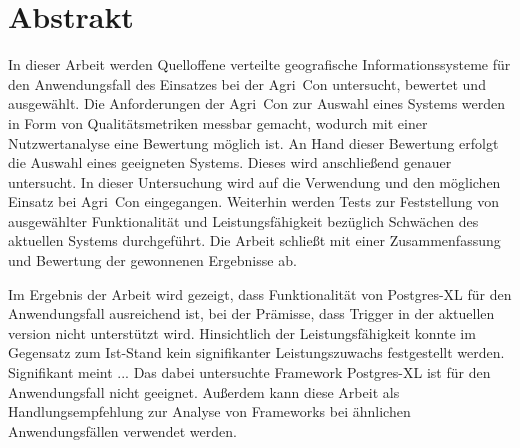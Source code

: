 
\chapter*{Abstrakt}
\label{sec:Abstrakt}
In dieser Arbeit werden Quelloffene verteilte geografische Informationssysteme für den Anwendungsfall des Einsatzes bei der Agri~Con untersucht, bewertet und ausgewählt.
Die Anforderungen der Agri~Con zur Auswahl eines Systems werden in Form von Qualitätsmetriken messbar gemacht, wodurch mit einer Nutzwertanalyse eine Bewertung möglich ist.
An Hand dieser Bewertung erfolgt die Auswahl eines geeigneten Systems.
Dieses wird anschließend genauer untersucht.
In dieser Untersuchung wird auf die Verwendung und den möglichen Einsatz bei Agri~Con eingegangen.
Weiterhin werden Tests zur Feststellung von ausgewählter Funktionalität und Leistungsfähigkeit bezüglich Schwächen des aktuellen Systems durchgeführt.
Die Arbeit schließt mit einer Zusammenfassung und Bewertung der gewonnenen Ergebnisse ab.

Im Ergebnis der Arbeit wird gezeigt, dass Funktionalität von Postgres-XL für den Anwendungsfall ausreichend ist, bei der Prämisse, dass Trigger in der aktuellen version nicht unterstützt wird.
Hinsichtlich der Leistungsfähigkeit konnte im Gegensatz zum Ist-Stand kein signifikanter Leistungszuwachs festgestellt werden.
Signifikant meint ... %
Das dabei untersuchte Framework Postgres-XL ist für den Anwendungsfall nicht geeignet.
Außerdem kann diese Arbeit als Handlungsempfehlung zur Analyse von Frameworks bei ähnlichen Anwendungsfällen verwendet werden.